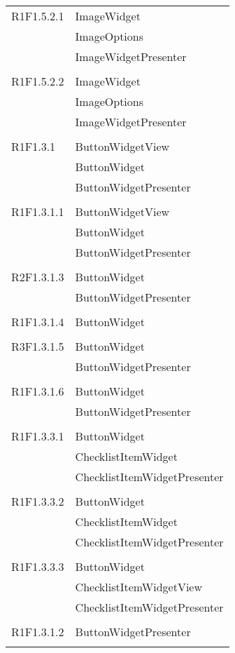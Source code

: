 \begin{center}
\begin{longtable}{|p{7cm}|p{7cm}|}
		R1F1.5.2.1 & ImageWidget \\ & ImageOptions \\ & ImageWidgetPresenter \\ & \\ \hline
		R1F1.5.2.2 & ImageWidget \\ & ImageOptions \\ & ImageWidgetPresenter \\ & \\ \hline
		R1F1.3.1 & ButtonWidgetView \\ & ButtonWidget \\ & ButtonWidgetPresenter \\ & \\ \hline
		R1F1.3.1.1 & ButtonWidgetView \\ & ButtonWidget \\ & ButtonWidgetPresenter \\ & \\ \hline
		R2F1.3.1.3 & ButtonWidget \\ & ButtonWidgetPresenter \\ & \\ \hline
		R1F1.3.1.4 & ButtonWidget \\ & \\ \hline
		R3F1.3.1.5 & ButtonWidget \\ & ButtonWidgetPresenter \\ & \\ \hline
		R1F1.3.1.6 & ButtonWidget \\ & ButtonWidgetPresenter \\ & \\ \hline
		R1F1.3.3.1 & ButtonWidget \\ & ChecklistItemWidget \\ & ChecklistItemWidgetPresenter \\ & \\ \hline
		R1F1.3.3.2 & ButtonWidget \\ & ChecklistItemWidget \\ & ChecklistItemWidgetPresenter \\ & \\ \hline
		R1F1.3.3.3 & ButtonWidget \\ & ChecklistItemWidgetView \\ & ChecklistItemWidgetPresenter \\ & \\ \hline
		R1F1.3.1.2 & ButtonWidgetPresenter \\ & \\ \hline

\end{longtable}
\end{center}
